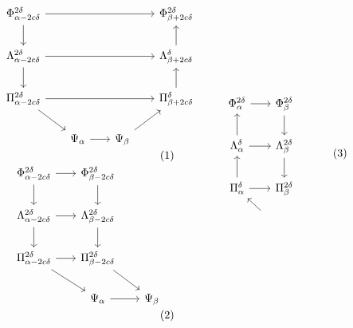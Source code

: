\begin{subequations}
\begin{minipage}{0.45\textwidth}
\begin{equation}\begin{tikzcd}[column sep=scriptsize]
  \Phi^{2\delta}_{\alpha-2c\delta}\arrow[to=B1]\arrow[to=A2] &&&
  |[alias=A2]|\Phi^{2\delta}_{\beta +2c\delta}\\
  |[alias=B1]|\Lambda^{2\delta}_{\alpha-2c\delta}\arrow[to=C1]\arrow[to=B2] &&&
  |[alias=B2]|\Lambda^{\delta}_{\beta +2c\delta}\arrow[to=A2]\\
  |[alias=C1]|\Pi^{2\delta}_{\alpha-2c\delta}\arrow[to=D1]\arrow[to=C2] &&&
  |[alias=C2]|\Pi^{\delta}_{\beta+2c\delta}\arrow[to=B2]\\
  & |[alias=D1]|\Psi_\alpha\arrow[to=D2] &
    |[alias=D2]|\Psi_\beta\arrow[to=C2]&
\end{tikzcd}\end{equation}
\begin{equation}\begin{tikzcd}[column sep=scriptsize]
  \Phi^{2\delta}_{\alpha-2c\delta}\arrow[to=B1]\arrow[to=A2] &
  |[alias=A2]|\Phi^{2\delta}_{\beta - 2c\delta} & \\
  |[alias=B1]|\Lambda^{2\delta}_{\alpha-2c\delta}\arrow[to=C1]\arrow[to=B2] &
  |[alias=B2]|\Lambda^{2\delta}_{\beta -2c\delta}\arrow[from=A2] &\\
  |[alias=C1]|\Pi^{2\delta}_{\alpha-2c\delta}\arrow[to=D1]\arrow[to=C2] &
  |[alias=C2]|\Pi^{2\delta}_{\beta-2c\delta}\arrow[from=B2] & \\
  & |[alias=D1]|\Psi_\alpha\arrow[to=D2] &
    |[alias=D2]|\Psi_\beta\arrow[from=C2]
\end{tikzcd}\end{equation}
\end{minipage}
\begin{minipage}{0.45\textwidth}
\begin{equation}\begin{tikzcd}[column sep=scriptsize]
  & \Phi^{2\delta}_{\alpha}\arrow[from=B1]\arrow[to=A2] &
    |[alias=A2]|\Phi^{2\delta}_{\beta} & \\
  & |[alias=B1]|\Lambda^{\delta}_{\alpha}\arrow[from=C1]\arrow[to=B2] &
    |[alias=B2]|\Lambda^{2\delta}_{\beta}\arrow[from=A2] & \\
  & |[alias=C1]|\Pi^{\delta}_{\alpha}\arrow[from=D1]\arrow[to=C2] &
    |[alias=C2]|\Pi^{2\delta}_{\beta}\arrow[from=B2] & \\

\end{tikzcd}
\end{equation}
\end{minipage}
\end{subequations}
